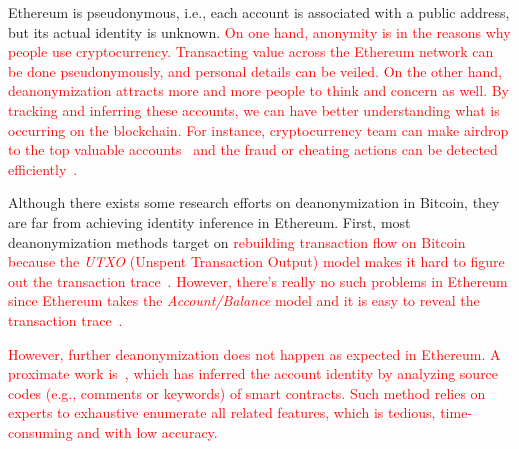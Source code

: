 
Ethereum is pseudonymous, i.e., each account is associated with a public address, but its actual identity is unknown. \textcolor{red}{On one hand, anonymity is in the reasons why people use cryptocurrency. Transacting value across the Ethereum network can be done pseudonymously, and personal details can be veiled. On the other hand, deanonymization attracts more and more people to think and concern as well. By tracking and inferring these accounts, we can have better understanding what is occurring on the blockchain. For instance, cryptocurrency team can make airdrop to the top valuable accounts~\cite{harrigan2018airdrops} and the fraud or cheating actions can be detected efficiently~\cite{monamo2016unsupervised}.}


Although there exists some research efforts on deanonymization in Bitcoin, they are far from achieving identity inference in Ethereum. First, most deanonymization methods target on \textcolor{red}{rebuilding transaction flow on Bitcoin because the \emph{UTXO} (Unspent Transaction Output) model makes it hard to figure out the transaction trace~\cite{reid2013analysis,zhao2015graph,meiklejohn2013fistful}. However, there's really no such problems in Ethereum since Ethereum takes the \emph{Account/Balance} model and it is easy to reveal the transaction trace~\cite{buterin2013ethereum}.}

\textcolor{red}{However, further deanonymization does not happen as expected in Ethereum. A proximate work is~\cite{chen2018infocom}, which has inferred the account identity by analyzing source codes (e.g., comments or keywords) of smart contracts. Such method relies on experts to exhaustive enumerate all related features, which is tedious, time-consuming and with low accuracy.}



